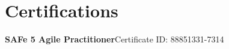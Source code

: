 \section{Certifications}
\resumeSubHeadingListStart
    \resumeProjectHeading
    {{\textbf{SAFe 5 Agile Practitioner}}}{Certificate ID: 88851331-7314}
\resumeSubHeadingListEnd